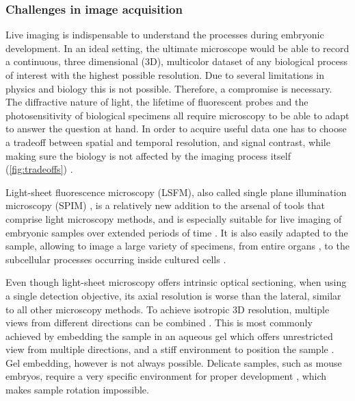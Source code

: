 \documentclass{booklet_style}
\begin{document}
\subsubsection{Challenges in image acquisition}
Live imaging is indispensable to understand the processes during embryonic development. In an ideal setting, the ultimate microscope would be able to record a continuous, three dimensional (3D), multicolor dataset of any biological process of interest with the highest possible resolution. Due to several limitations in physics and biology this is not possible. Therefore, a compromise is necessary. The diffractive nature of light, the lifetime of fluorescent probes and the photosensitivity of biological specimens all require microscopy to be able to adapt to answer the question at hand. In order to acquire useful data one has to choose a tradeoff between spatial and temporal resolution, and signal contrast, while making sure the biology is not affected by the imaging process itself (\autoref{fig:tradeoffs}) \cite{laissue_assessing_2017}.

Light-sheet fluorescence microscopy (LSFM), also called single plane illumination microscopy (SPIM) \cite{huisken_optical_2004}, is a relatively new addition to the arsenal of tools that comprise light microscopy methods, and is especially suitable for live imaging of embryonic samples over extended periods of time \cite{keller_quantitative_2008, huisken_selective_2009, weber_light_2011,tomer_shedding_2011}. It is also easily adapted to the sample, allowing to image a large variety of specimens, from entire organs \cite{dodt_ultramicroscopy:_2007}, to the subcellular processes occurring inside cultured cells \cite{chen_lattice_2014}.

Even though light-sheet microscopy offers intrinsic optical sectioning, when using a single detection objective, its axial resolution is worse than the lateral, similar to all other microscopy methods.
To achieve isotropic 3D resolution, multiple views from different directions can be combined \cite{preibisch_efficient_2014}. This is most commonly achieved by embedding the sample in an aqueous gel which offers unrestricted view from multiple directions, and a stiff environment to position the sample \cite{krzic_multiview_2012}. Gel embedding, however is not always possible. Delicate samples, such as mouse embryos, require a very specific environment for proper development \cite{doherty_culture_2000}, which makes sample rotation impossible.
\end{document}
